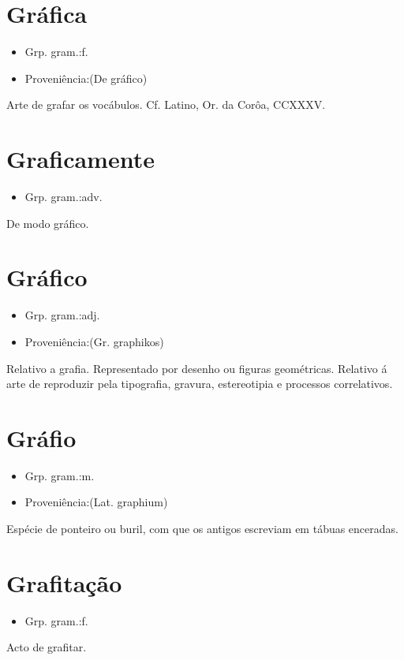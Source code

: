 \section{Gráfica}
\begin{itemize}
\item {Grp. gram.:f.}
\end{itemize}
\begin{itemize}
\item {Proveniência:(De \textunderscore gráfico\textunderscore )}
\end{itemize}
Arte de grafar os vocábulos. Cf. Latino, \textunderscore Or. da Corôa\textunderscore , CCXXXV.
\section{Graficamente}
\begin{itemize}
\item {Grp. gram.:adv.}
\end{itemize}
De modo gráfico.
\section{Gráfico}
\begin{itemize}
\item {Grp. gram.:adj.}
\end{itemize}
\begin{itemize}
\item {Proveniência:(Gr. \textunderscore graphikos\textunderscore )}
\end{itemize}
Relativo a grafia.
Representado por desenho ou figuras geométricas.
Relativo á arte de reproduzir pela tipografia, gravura, estereotipia e processos correlativos.
\section{Gráfio}
\begin{itemize}
\item {Grp. gram.:m.}
\end{itemize}
\begin{itemize}
\item {Proveniência:(Lat. \textunderscore graphium\textunderscore )}
\end{itemize}
Espécie de ponteiro ou buril, com que os antigos escreviam em tábuas enceradas.
\section{Grafitação}
\begin{itemize}
\item {Grp. gram.:f.}
\end{itemize}
Acto de grafitar.
